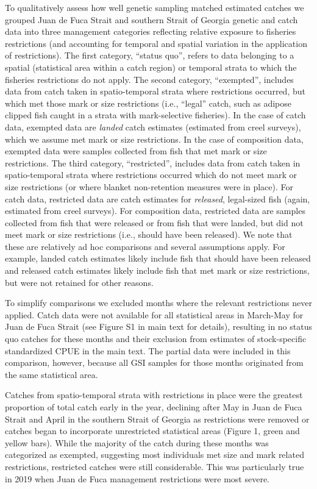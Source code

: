 \documentclass[
]{article}
\begin{document}
To qualitatively assess how well genetic sampling matched estimated
catches we grouped Juan de Fuca Strait and southern Strait of Georgia
genetic and catch data into three management categories reflecting
relative exposure to fisheries restrictions (and accounting for temporal
and spatial variation in the application of restrictions). The first
category, ``status quo'', refers to data belonging to a spatial
(statistical area within a catch region) or temporal strata to which the
fisheries restrictions do not apply. The second category, ``exempted'',
includes data from catch taken in spatio-temporal strata where
restrictions occurred, but which met those mark or size restrictions
(i.e., ``legal'' catch, such as adipose clipped fish caught in a strata
with mark-selective fisheries). In the case of catch data, exempted data
are \emph{landed} catch estimates (estimated from creel surveys), which
we assume met mark or size restrictions. In the case of composition
data, exempted data were samples collected from fish that met mark or
size restrictions. The third category, ``restricted'', includes data
from catch taken in spatio-temporal strata where restrictions occurred
which do not meet mark or size restrictions (or where blanket
non-retention measures were in place). For catch data, restricted data
are catch estimates for \emph{released}, legal-sized fish (again,
estimated from creel surveys). For composition data, restricted data are
samples collected from fish that were released or from fish that were
landed, but did not meet mark or size restrictions (i.e., should have
been released). We note that these are relatively ad hoc comparisons and
several assumptions apply. For example, landed catch estimates likely
include fish that should have been released and released catch estimates
likely include fish that met mark or size restrictions, but were not
retained for other reasons.

To simplify comparisons we excluded months where the relevant
restrictions never applied. Catch data were not available for all
statistical areas in March-May for Juan de Fuca Strait (see Figure S1 in
main text for details), resulting in no status quo catches for these
months and their exclusion from estimates of stock-specific standardized
CPUE in the main text. The partial data were included in this
comparison, however, because all GSI samples for those months originated
from the same statistical area.

Catches from spatio-temporal strata with restrictions in place were the
greatest proportion of total catch early in the year, declining after
May in Juan de Fuca Strait and April in the southern Strait of Georgia
as restrictions were removed or catches began to incorporate
unrestricted statistical areas (Figure 1, green and yellow bars). While
the majority of the catch during these months was categorized as
exempted, suggesting most individuals met size and mark related
restrictions, restricted catches were still considerable. This was
particularly true in 2019 when Juan de Fuca management restrictions were
most severe.
\end{document}
